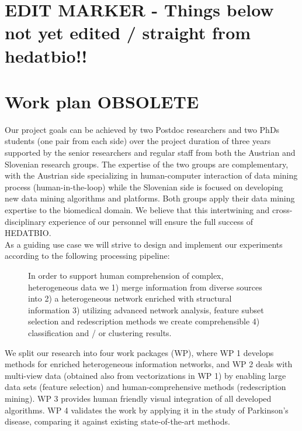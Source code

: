\documentclass[a4paper,11pt]{article}
\begin{document}

\section{EDIT MARKER - Things below not yet edited / straight from hedatbio!!}

\newpage

%
%
\section{Work plan OBSOLETE} 

Our project goals can be achieved by two Postdoc researchers and two PhDs students (one pair from each side) over the project duration of three years
supported by the senior researchers and regular staff from both the Austrian and Slovenian research groups.
The expertise of the two groups are complementary, with the Austrian side specializing in human-computer interaction of data mining process (human-in-the-loop) while the Slovenian side is focused on developing new data mining algorithms and platforms. Both groups apply their data mining expertise to the biomedical domain. We believe that this intertwining and cross-disciplinary experience of our personnel will ensure the full success of HEDATBIO.
\\[-0,3cm]

As a guiding use case we will strive to design and implement our experiments according to the following processing pipeline:
\\[-0,3cm]

\begin{figure}[ht]
	\centering
	\caption{In order to  support human comprehension of complex, heterogeneous data we 1) merge information from diverse sources into 2) a heterogeneous network enriched with structural information 3) utilizing advanced network analysis, feature subset selection and redescription methods we create comprehensible 4) classification and / or clustering results.}
	\label{fig:pipeline}
\end{figure}
We split our research into four work packages (WP), where WP 1 develops methods for enriched heterogeneous information networks, and WP 2 deals with multi-view data (obtained also from vectorizations in WP 1) by enabling large data sets (feature selection) and human-comprehensive methods (redescription mining). WP 3 provides human friendly visual integration of all developed algorithms. WP 4 validates the work by applying it in the study of Parkinson's disease, comparing it against existing state-of-the-art methods.
\end{document}
